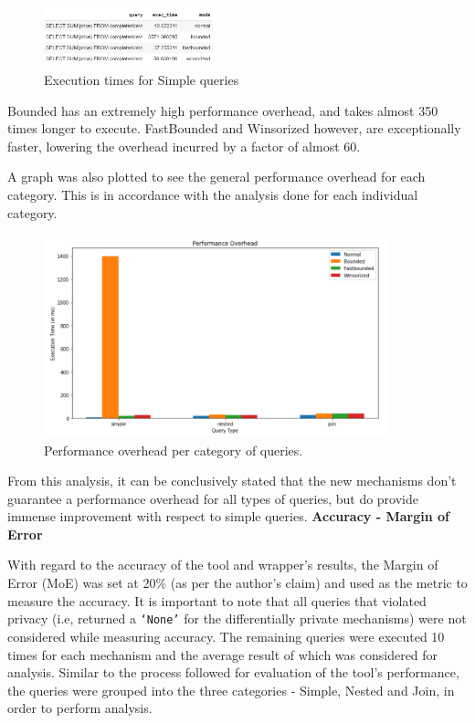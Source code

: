 \documentclass[acmsmall]{acmart}
\begin{document}
\begin{figure}[htp]
    \centering
    \includegraphics[width=5cm]{Fig 4.4.3.png}
    \caption{Execution times for Simple queries}
    \label{Fig:4.4.3}
\end{figure}

Bounded has an extremely high performance overhead, and takes almost 350 times longer to execute. FastBounded and Winsorized however, are exceptionally faster, lowering the overhead incurred by a factor of almost 60.

A graph was also plotted to see the general performance overhead for each category. This is in accordance with the analysis done for each individual category.

\begin{figure}[htp]
    \centering
    \includegraphics[width=10cm]{Fig 4.4.4.png}
    \caption{Performance overhead per category of queries.}
    \label{Fig:4.4.4}
\end{figure}

From this analysis, it can be conclusively stated that the new mechanisms don’t guarantee a performance overhead for all types of queries, but do provide immense improvement with respect to simple queries.
\newline
\newline
\textbf{Accuracy - Margin of Error}

With regard to the accuracy of the tool and wrapper’s results, the Margin of Error (MoE) was set at 20\% (as per the author’s claim) and used as the metric to measure the accuracy. It is important to note that all queries that violated privacy (i.e, returned a \texttt{‘None’} for the differentially private mechanisms) were not considered while measuring accuracy. The remaining queries were executed 10 times for each mechanism and the average result of which was considered for analysis. Similar to the process followed for evaluation of the tool’s performance, the queries were grouped into the three categories - Simple, Nested and Join, in order to perform analysis.
\end{document}

